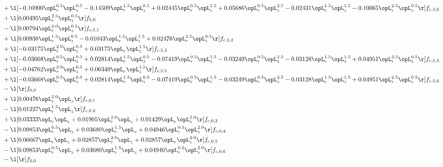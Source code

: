 \begin{alignat}{2}
& + \l[  -0.16900 \opL_r^{0.5} \opL_z^{0.5}   -0.14509 \opL_r^{1.5} \opL_z^{0.5} +  0.02445 \opL_r^{0.5} \opL_z^{1.5} +  0.05686 \opL_r^{0.5} \opL_z^{2.5}   -0.02431 \opL_r^{1.5} \opL_z^{1.5}   -0.10065 \opL_r^{2.5} \opL_z^{0.5}  \r] f_{c,3,6} \nonumber \\ 
& + \l[  0.00495 \opL_r^{2.5} \opL_z^{0.5}  \r] f_{5,0} \nonumber \\ 
& - \l[  0.00794 \opL_r^{2.0} \opL_z^{0.5}  \r] f_{c,5,1} \nonumber \\ 
& + \l[  0.00938 \opL_r^{1.5} \opL_z^{0.5}   -0.01043 \opL_r^{1.5} \opL_z^{1.5} +  0.02476 \opL_r^{2.5} \opL_z^{0.5}  \r] f_{c,5,2} \nonumber \\ 
& + \l[  -0.03175 \opL_r^{2.0} \opL_z^{0.5} +  0.03175 \opL_r \opL_z^{1.5}  \r] f_{c,5,3} \nonumber \\ 
& + \l[  -0.03668 \opL_r^{0.5} \opL_z^{0.5} +  0.02814 \opL_r^{1.5} \opL_z^{0.5}   -0.07419 \opL_r^{0.5} \opL_z^{1.5}   -0.03249 \opL_r^{0.5} \opL_z^{2.5}   -0.03128 \opL_r^{1.5} \opL_z^{1.5} +  0.04951 \opL_r^{2.5} \opL_z^{0.5}  \r] f_{c,5,4} \nonumber \\ 
& + \l[  -0.04762 \opL_r^{2.0} \opL_z^{0.5} +  0.06349 \opL_r \opL_z^{1.5}  \r] f_{c,5,5} \nonumber \\ 
& + \l[  -0.03668 \opL_r^{0.5} \opL_z^{0.5} +  0.02814 \opL_r^{1.5} \opL_z^{0.5}   -0.07419 \opL_r^{0.5} \opL_z^{1.5}   -0.03249 \opL_r^{0.5} \opL_z^{2.5}   -0.03128 \opL_r^{1.5} \opL_z^{1.5} +  0.04951 \opL_r^{2.5} \opL_z^{0.5}  \r] f_{c,5,6} \nonumber \\ 
& - \l[  \r] f_{0,0} \nonumber \\ 
& + \l[  0.00476 \opL_r^{2.0} \opL_z  \r] f_{c,0,1} \nonumber \\ 
& - \l[  0.01227 \opL_r^{1.5} \opL_z  \r] f_{c,0,2} \nonumber \\ 
& + \l[  0.03333 \opL_r \opL_z +  0.01905 \opL_r^{2.0} \opL_z +  0.01429 \opL_r \opL_z^{2.0}  \r] f_{c,0,3} \nonumber \\ 
& - \l[  0.09853 \opL_r^{0.5} \opL_z +  0.03680 \opL_r^{1.5} \opL_z +  0.04946 \opL_r^{0.5} \opL_z^{2.0}  \r] f_{c,0,4} \nonumber \\ 
& + \l[  0.06667 \opL_r \opL_z +  0.02857 \opL_r^{2.0} \opL_z +  0.02857 \opL_r \opL_z^{2.0}  \r] f_{c,0,5} \nonumber \\ 
& - \l[  0.09853 \opL_r^{0.5} \opL_z +  0.03680 \opL_r^{1.5} \opL_z +  0.04946 \opL_r^{0.5} \opL_z^{2.0}  \r] f_{c,0,6} \nonumber \\ 
& - \l[  \r] f_{2,0} \nonumber \\ 

\end{alignat}
